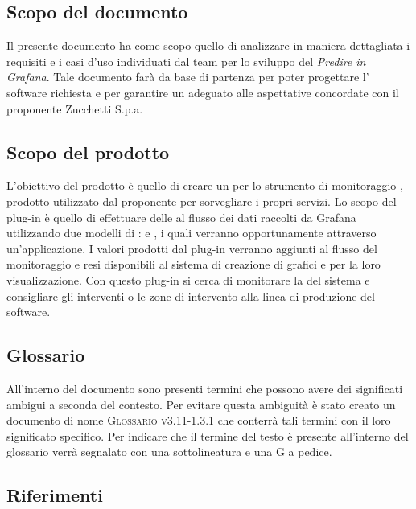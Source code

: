 \documentclass[../analisi-dei-requisiti.tex]{subfiles}
\begin{document}
\subsection{Scopo del documento}%
\label{subs:scopo_del_documento}
Il presente documento ha come scopo quello di analizzare in maniera dettagliata i requisiti e i casi d'uso individuati dal team per lo sviluppo del  \emph{Predire in Grafana}. Tale documento farà da base di partenza per poter progettare l' software richiesta e per garantire un  adeguato alle aspettative concordate con il proponente Zucchetti S.p.a.

\subsection{Scopo del prodotto}%
\label{subs:scopo_del_prodotto}
L'obiettivo del prodotto è quello di creare un  per lo strumento di monitoraggio , prodotto utilizzato dal proponente per sorvegliare i propri servizi. Lo scopo del plug-in è quello di effettuare delle  al flusso dei dati raccolti da Grafana utilizzando due modelli di :  e , i quali verranno opportunamente  attraverso un'applicazione. I valori prodotti dal plug-in verranno aggiunti al flusso del monitoraggio e resi disponibili al sistema di creazione di grafici e  per la loro visualizzazione. Con questo plug-in si cerca di monitorare la  del sistema e consigliare gli interventi o le zone di intervento alla linea di produzione del software.

\subsection{Glossario}
\label{subs:glossario}
All'interno del documento sono presenti termini che possono avere dei significati ambigui a seconda del contesto. Per evitare questa ambiguità è stato creato un documento di nome \textsc{Glossario v3.11-1.3.1} che conterrà tali termini con il loro significato specifico. Per indicare che il termine del testo è presente all'interno del glossario verrà segnalato con una sottolineatura e una G a pedice.

\subsection{Riferimenti}
\label{subs:riferimenti}
\end{document}
